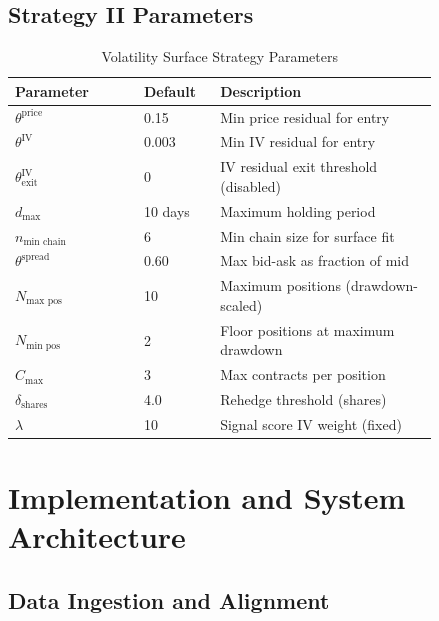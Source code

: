 \documentclass[10pt,twocolumn]{article}
\begin{document}
\subsection{Strategy II Parameters}

\begin{table}[tb]
\centering
\caption{Volatility Surface Strategy Parameters}
\label{tab:params_surface}
\small
\setlength{\tabcolsep}{4pt}
\renewcommand{\arraystretch}{1.1}
\begin{tabular}{p{0.26\linewidth} p{0.14\linewidth} p{0.44\linewidth}}
\toprule
\textbf{Parameter} & \textbf{Default} & \textbf{Description} \\
\midrule
$\theta^{\text{price}}$         & 0.15  & Min price residual for entry \\
$\theta^{\text{IV}}$            & 0.003 & Min IV residual for entry \\
$\theta_{\text{exit}}^{\text{IV}}$ & 0     & IV residual exit threshold (disabled) \\
$d_{\text{max}}$                & 10 days & Maximum holding period \\
$n_{\text{min chain}}$          & 6     & Min chain size for surface fit \\
$\theta^{\text{spread}}$        & 0.60  & Max bid-ask as fraction of mid \\
$N_{\text{max pos}}$            & 10    & Maximum positions (drawdown-scaled) \\
$N_{\text{min pos}}$            & 2     & Floor positions at maximum drawdown \\
$C_{\text{max}}$                & 3     & Max contracts per position \\
$\delta_{\text{shares}}$        & 4.0   & Rehedge threshold (shares) \\
$\lambda$                       & 10    & Signal score IV weight (fixed) \\
\bottomrule
\end{tabular}
\end{table}


\section{Implementation and System Architecture}

\subsection{Data Ingestion and Alignment}
\end{document}
